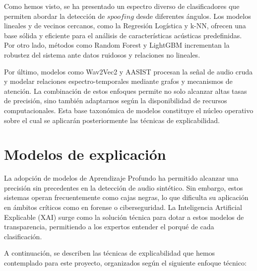 















Como hemos visto, se ha presentado un espectro diverso de clasificadores que permiten abordar la detección de $spoofing$ desde diferentes ángulos. Los modelos lineales y de vecinos cercanos, como la Regresión Logística y k-NN, ofrecen una base sólida y eficiente para el análisis de características acústicas predefinidas. Por otro lado, métodos como Random Forest y LightGBM incrementan la robustez del sistema ante datos ruidosos y relaciones no lineales.

Por último, modelos como Wav2Vec2 y AASIST procesan la señal de audio cruda y modelar relaciones espectro-temporales mediante grafos y mecanismos de atención. La combinación de estos enfoques permite no solo alcanzar altas tasas de precisión, sino también adaptarnos según la disponibilidad de recursos computacionales. Esta base taxonómica de modelos constituye el núcleo operativo sobre el cual se aplicarán posteriormente las técnicas de explicabilidad.

\section{Modelos de explicación}
\label{subsec:modelos_explicacion}

La adopción de modelos de Aprendizaje Profundo ha permitido alcanzar una precisión sin precedentes en la detección de audio sintético. Sin embargo, estos sistemas operan frecuentemente como cajas negras, lo que dificulta su aplicación en ámbitos críticos como en forense o ciberseguridad. La Inteligencia Artificial Explicable (XAI) surge como la solución técnica para dotar a estos modelos de transparencia, permitiendo a los expertos entender el porqué de cada clasificación.

A continuación, se describen las técnicas de explicabilidad que hemos contemplado para este proyecto, organizados según el siguiente enfoque técnico:

